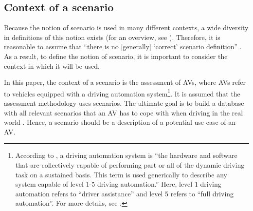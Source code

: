 \subsection{Context of a scenario}
\label{sec:context}

Because the notion of scenario is used in many different contexts, a wide diversity in definitions of this notion exists (for an overview, see \autocite{vannotten2003updated, bishop2007scentechniques}). Therefore, it is reasonable to assume that ``there is no [generally] `correct' scenario definition'' \autocite{vannotten2003updated}. As a result, to define the notion of scenario, it is important to consider the context in which it will be used. 

In this paper, the context of a scenario is the assessment of AVs, where AVs refer to vehicles equipped with a driving automation system\footnote{According to \autocite{sae2018j3016}, a driving automation system is ``the hardware and software that are collectively capable of performing part or all of the dynamic driving task on a sustained basis. This term is used generically to describe any system capable of level 1-5 driving automation.'' Here, level 1 driving automation refers to ``driver assistance'' and level 5 refers to ``full driving automation''. For more details, see \autocite{sae2018j3016}.}. 
It is assumed that the assessment methodology uses scenarios. %
The ultimate goal is to build a database with all relevant scenarios that an AV has to cope with when driving in the real world \autocite{putz2017pegasus}. Hence, a scenario should be a description of a potential use case of an AV. 




